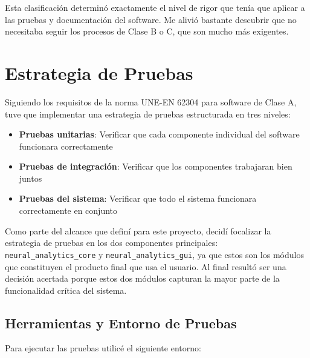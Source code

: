 Esta clasificación determinó exactamente el nivel de rigor que tenía que aplicar a las pruebas y documentación del software. Me alivió bastante descubrir que no necesitaba seguir los procesos de Clase B o C, que son mucho más exigentes.

\section{Estrategia de Pruebas}

Siguiendo los requisitos de la norma UNE-EN 62304 para software de Clase A, tuve que implementar una estrategia de pruebas estructurada en tres niveles:

\begin{itemize}
    \item \textbf{Pruebas unitarias}: Verificar que cada componente individual del software funcionara correctamente
    \item \textbf{Pruebas de integración}: Verificar que los componentes trabajaran bien juntos
    \item \textbf{Pruebas del sistema}: Verificar que todo el sistema funcionara correctamente en conjunto
\end{itemize}

Como parte del alcance que definí para este proyecto, decidí focalizar la estrategia de pruebas en los dos componentes principales: \texttt{neural\_analytics\_core} y \texttt{neural\_analytics\_gui}, ya que estos son los módulos que constituyen el producto final que usa el usuario. Al final resultó ser una decisión acertada porque estos dos módulos capturan la mayor parte de la funcionalidad crítica del sistema.

\subsection{Herramientas y Entorno de Pruebas}

Para ejecutar las pruebas utilicé el siguiente entorno:

